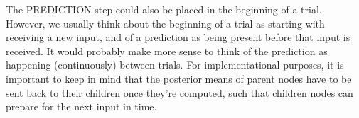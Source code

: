 The \textsf{PREDICTION step} could also be placed in the beginning of a trial. However, we usually think about the beginning of a trial as starting with receiving a new input, and of a prediction as being present before that input is received. It would probably make more sense to think of the prediction as happening (continuously) between trials. For implementational purposes, it is important to keep in mind that the posterior means of parent nodes have to be sent back to their children once they're computed, such that children nodes can prepare for the next input in time.

